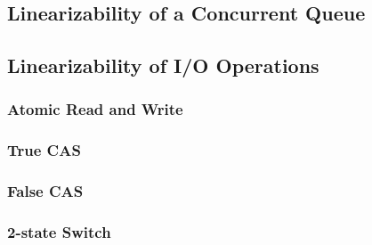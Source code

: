 \documentclass[oneside, a4paper, onecolumn, 10pt]{article}
\begin{document}
\subsection{Linearizability of a Concurrent Queue}
\subsection{Linearizability of I/O Operations}
\subsubsection{Atomic Read and Write}
\subsubsection{True CAS}
\subsubsection{False CAS}
\subsubsection{2-state Switch}
\end{document}
